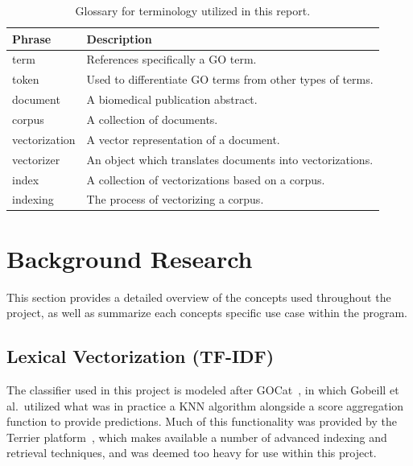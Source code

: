 \documentclass[11pt]{article}
\theoremstyle{plain}
\theoremstyle{definition}
\begin{document}
\begin{table}[H]
    \centering
    \begin{tabular}{| m{10em}  |m{20em} |}
        \hline
        Phrase        & Description                                                \\
        \hline
        \hline
        term          & References specifically a GO term.                         \\
        \hline
        token         & Used to differentiate GO terms from other types of terms.  \\
        \hline
        document      & A biomedical publication abstract.                         \\
        \hline
        corpus        & A collection of documents.                                 \\
        \hline
        vectorization & A vector representation of a document.                     \\
        \hline
        vectorizer    & An object which translates documents into  vectorizations. \\
        \hline
        index         & A collection of vectorizations based on a corpus.          \\
        \hline
        indexing      & The process of vectorizing a corpus.                       \\
        \hline
    \end{tabular}
    \caption{Glossary for terminology utilized in this report.}\label{tab:terminology}
\end{table}

\section{Background Research}\label{sec:background}

This section provides a detailed overview of the concepts used throughout the project, as well as summarize each concepts specific use case within the program.

\subsection{Lexical Vectorization (TF-IDF)}\label{sec:background-lexical}

The classifier used in this project is modeled after GOCat~\cite{gobeill/2013/managing}, in which Gobeill et al.\ utilized what was in practice a KNN algorithm alongside a score aggregation function to provide predictions. Much of this functionality was provided by the Terrier platform~\cite{ounis/2006/terrier}, which makes available a number of advanced indexing and retrieval techniques, and was deemed too heavy for use within this project.
\end{document}
